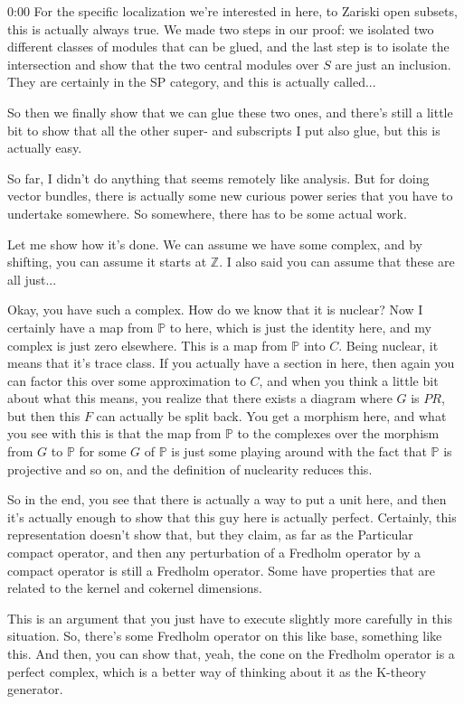 \begin{unfinished}{0:00}
For the specific localization we're interested in here, to Zariski open subsets, this is actually always true. We made two steps in our proof: we isolated two different classes of modules that can be glued, and the last step is to isolate the intersection and show that the two central modules over $S$ are just an inclusion. They are certainly in the SP category, and this is actually called...

So then we finally show that we can glue these two ones, and there's still a little bit to show that all the other super- and subscripts I put also glue, but this is actually easy.

So far, I didn't do anything that seems remotely like analysis. But for doing vector bundles, there is actually some new curious power series that you have to undertake somewhere. So somewhere, there has to be some actual work.

Let me show how it's done. We can assume we have some complex, and by shifting, you can assume it starts at $\mathbb{Z}$. I also said you can assume that these are all just...

Okay, you have such a complex. How do we know that it is nuclear? Now I certainly have a map from $\mathbb{P}$ to here, which is just the identity here, and my complex is just zero elsewhere. This is a map from $\mathbb{P}$ into $C$. Being nuclear, it means that it's trace class. If you actually have a section in here, then again you can factor this over some approximation to $C$, and when you think a little bit about what this means, you realize that there exists a diagram where $G$ is $PR$, but then this $F$ can actually be split back. You get a morphism here, and what you see with this is that the map from $\mathbb{P}$ to the complexes over the morphism from $G$ to $\mathbb{P}$ for some $G$ of $\mathbb{P}$ is just some playing around with the fact that $\mathbb{P}$ is projective and so on, and the definition of nuclearity reduces this.

So in the end, you see that there is actually a way to put a unit here, and then it's actually enough to show that this guy here is actually perfect. Certainly, this representation doesn't show that, but they claim, as far as the
Particular compact operator, and then any perturbation of a Fredholm operator by a compact operator is still a Fredholm operator. Some have properties that are related to the kernel and cokernel dimensions.

This is an argument that you just have to execute slightly more carefully in this situation. So, there's some Fredholm operator on this like base, something like this. And then, you can show that, yeah, the cone on the Fredholm operator is a perfect complex, which is a better way of thinking about it as the K-theory generator.


\end{unfinished}
